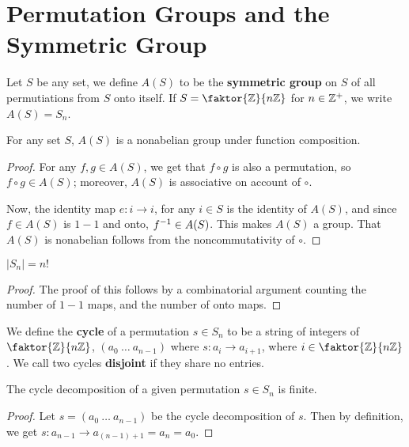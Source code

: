\section{Permutation Groups and the Symmetric Group}
\label{section_1.3}

\begin{definition}
  Let $S$ be any set, we define $A(S)$ to be the \textbf{symmetric group} on
  $S$ of all permutiations from  $S$ onto itself. If  $S=\faktor{\Z}{n\Z}$ for
  $n \in \mathbb{Z}^+$, we write $A(S)=S_n$.
\end{definition}

\begin{theorem}\label{theorem_1.3.1}
  For any set $S$, $A(S)$ is a nonabelian group under function composition.
\end{theorem}
\begin{proof}
  For any $f,g \in A(S)$, we get that $f \circ g$ is also a permutation, so
  $f \circ g \in A(S)$; moreover, $A(S)$ is associative on account of $\circ$.

  Now, the identity map $e:i \rightarrow i$, for any $i \in S$ is the identity
  of $A(S)$, and since $f \in A(S)$ is $1-1$ and onto,  $f^{-1} \in A(S)$.
  This makes $A(S)$ a group. That $A(S)$ is nonabelian follows from the
  noncommutativity of $\circ$.
\end{proof}
\begin{corollary}
  $|S_n|=n!$
\end{corollary}
\begin{proof}
  The proof of this follows by a combinatorial argument counting the number of
  $1-1$ maps, and the number of onto maps.
\end{proof}

\begin{definition}
  We define the \textbf{cycle} of a permutation $s \in S_n$ to be a string of
  integers of  $\faktor{\Z}{n\Z}$, $(a_0 \ \dots \ a_{n-1})$ where $s:a_i
  \rightarrow a_{i+1}$, where $i \in \faktor{\Z}{n\Z}$. We call two cycles
  \textbf{disjoint} if they share no entries.
\end{definition}

\begin{lemma}\label{lemma_1.3.2}
  The cycle decomposition of a given permutation $s \in S_n$ is finite.
\end{lemma}
\begin{proof}
  Let $s=(a_0 \ \dots  \ a_{n-1})$ be the cycle decomposition of $s$. Then by
  definition, we get  $s:a_{n-1} \rightarrow a_{(n-1)+1}=a_n=a_0$.
\end{proof}

